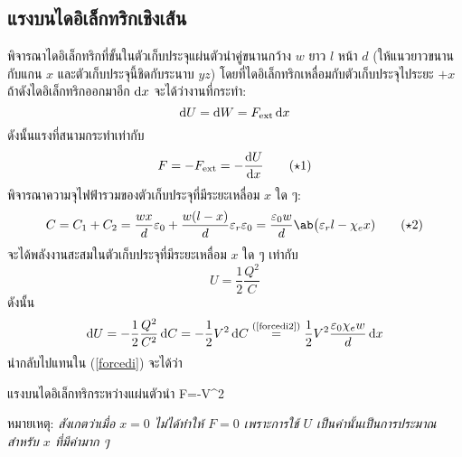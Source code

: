 \subsection{แรงบนไดอิเล็กทริกเชิงเส้น}
พิจารณาไดอิเล็กทริกที่ขั้นในตัวเก็บประจุแผ่นตัวนำคู่ขนานกว้าง $w$ ยาว $l$ หน้า $d$ (ให้แนวยาวขนานกับแกน $x$ และตัวเก็บประจุนี้ชิดกับระนาบ $yz$) โดยที่ไดอิเล็กทริกเหลื่อมกับตัวเก็บประจุไประยะ $+x$ ถ้าดังไดอิเล็กทริกออกมาอีก $\odif{x}$ จะได้ว่างานที่กระทำ:
\[\odif{U}=\odif{W}=F_\exr\odif{x}\]
ดังนั้นแรงที่สนามกระทำเท่ากับ
\begin{equation}
    F=-F_\exr=-\odv{U}{x}\tag{$\star$1}\label{forcedi}
\end{equation}
พิจารณาความจุไฟฟ้ารวมของตัวเก็บประจุที่มีระยะเหลื่อม $x$ ใด ๆ:
\begin{equation}
C=C_1+C_2=\frac{wx}{d}\eps_0+\frac{w(l-x)}{d}\eps_r\eps_0=\frac{\eps_0w}{d}\ab\big(\eps_rl-\chi_ex)\tag{$\star$2}\label{forcedi2}
\end{equation}
จะได้พลังงานสะสมในตัวเก็บประจุที่มีระยะเหลื่อม $x$ ใด ๆ เท่ากับ
\[U=\frac{1}{2}\frac{Q^2}{C}\]
ดังนั้น
\[\odif{U}=-\frac{1}{2}\frac{Q^2}{C^2}\odif{C}=-\frac{1}{2}V^2\odif{C}\overset{\text{(\ref{forcedi2})}}{=}\frac{1}{2}V^2\frac{\eps_0\chi_ew}{d}\odif{x}\]
นำกลับไปแทนใน (\ref{forcedi}) จะได้ว่า
\begin{eqbox}{แรงบนไดอิเล็กทริกระหว่างแผ่นตัวนำ}
    F=-V^2
\end{eqbox}
หมายเหตุ: \emph{สังเกตว่าเมื่อ $x=0$ ไม่ได้ทำให้ $F=0$ เพราะการใช้ $U$ เป็นค่านั้นเป็นการประมาณสำหรับ $x$ ที่มีค่ามาก ๆ}